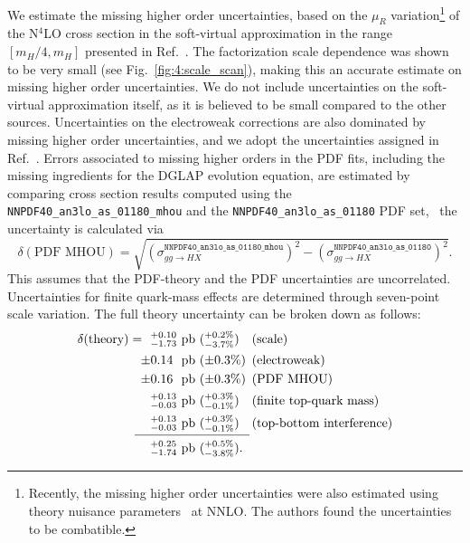 We estimate the missing higher order uncertainties, based on the $\mu_R$ variation\footnote{Recently, the missing higher order uncertainties were also estimated using theory nuisance parameters~\cite{Lim:2024nsk} at \acs{NNLO}. The authors found the uncertainties to be combatible.} of the N${}^4$LO cross section in the soft-virtual approximation in the range $[m_H/4, m_H]$ presented in Ref.~\cite{Das:2020adl}. The factorization scale dependence was shown to be very small (see Fig.~\ref{fig:4:scale_scan}), making this an accurate estimate on missing higher order uncertainties. We do not include uncertainties on the soft-virtual approximation itself, as it is believed to be small compared to the other sources. Uncertainties on the electroweak corrections are also dominated by missing higher order uncertainties, and we adopt the uncertainties assigned in Ref.~\cite{Becchetti:2020wof}. Errors associated to missing higher orders in the \acs{PDF} fits, including the missing ingredients for the DGLAP evolution equation, are estimated by comparing cross section results computed using the \texttt{NNPDF40\_an3lo\_as\_01180\_mhou} and the \texttt{NNPDF40\_an3lo\_as\_01180} \acs{PDF} set, \ie\ the uncertainty is calculated via
\begin{equation}
\delta (\text{PDF MHOU}) = \sqrt{\left(\sigma_{gg \rightarrow HX}^\mathtt{NNPDF40\_an3lo\_as\_01180\_mhou} \right)^2 - \left(\sigma_{gg \rightarrow HX}^\mathtt{NNPDF40\_an3lo\_as\_01180} \right)^2}.
\end{equation}
This assumes that the \acs{PDF}-theory and the \acs{PDF} uncertainties are uncorrelated. Uncertainties for finite quark-mass effects are determined through seven-point scale variation. The full theory uncertainty can be broken down as follows:
\begin{equation}
\begin{alignedat}{5}
\delta(\text{theory}) =\ \  & {}^{+0.10}_{-1.73}\ &&\text{pb    }  && ({}_{-3.7\%}^{+0.2\%}) \quad  &&(\text{scale}) \\
\pm & 0.14\ &&\mathrm{pb}  && (\pm 0.3\%) &&(\text{electroweak}) \\
\pm & 0.16\ &&\mathrm{pb} && (\pm 0.3\%) &&(\text{PDF MHOU}) \\
& {}^{+0.13}_{-0.03}\ &&\mathrm{pb}  && ({}_{-0.1\%}^{+0.3\%}) &&(\text{finite top-quark mass}) \\
& {}^{+0.13}_{-0.03}\ &&\mathrm{pb}  && ({}_{-0.1\%}^{+0.3\%}) &&(\text{top-bottom interference}) \\[-10pt]
& && \hspace{0.3cm} \mathclap{\rule{3.2cm}{0.4pt}}\\[-4pt]
& {}^{+0.25}_{-1.74}  \ &&\mathrm{pb} && ({}_{-3.8\%}^{+0.5\%}).
\end{alignedat}
\end{equation}
